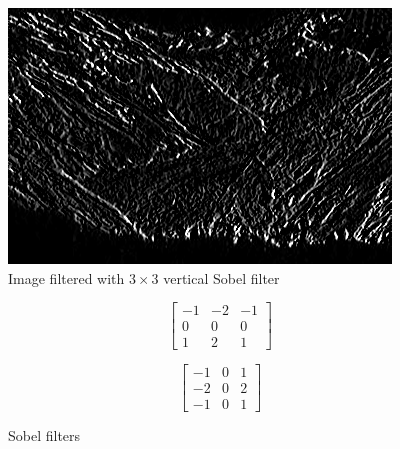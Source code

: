 \documentclass{article}
\begin{document}
\begin{figure}[H]
	\centering
	\includegraphics[width=288pt]{../result/filter-sobel-1.png}
	\caption{Image filtered with $3 \times 3$ vertical Sobel filter}
\end{figure}

\begin{figure}[H]
	\centering
	\begin{minipage}[b]{0.30\linewidth}
		\[ \begin{bmatrix}
			-1 & -2 & -1 \\
			 0 &  0 &  0 \\
			 1 &  2 &  1
		\end{bmatrix} \]
	\end{minipage}
	\begin{minipage}[b]{0.30\linewidth}
		\[ \begin{bmatrix}
			-1 &  0 &  1 \\
		    -2 &  0 &  2 \\
			-1 &  0 &  1
		\end{bmatrix} \]
	\end{minipage}
	\caption{Sobel filters}
\end{figure}
\end{document}
